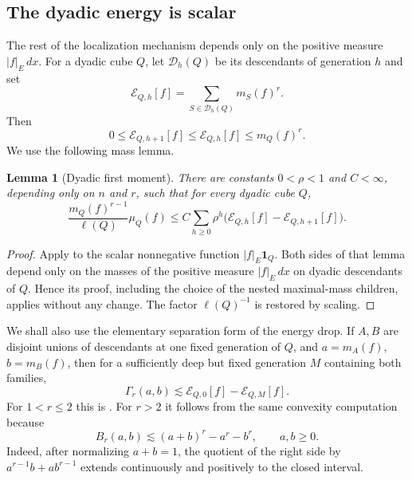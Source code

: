 \documentclass[11pt]{amsart}
\numberwithin{equation}{section}
\newtheorem{lemma}[theorem]{Lemma}
\theoremstyle{definition}
\theoremstyle{remark}
\newcommand{\cD}{\mathcal D}
\begin{document}
\subsection{The dyadic energy is scalar}
The rest of the localization mechanism depends only on the positive measure
$|f|_E\,dx$.  For a dyadic cube $Q$, let $\cD_h(Q)$ be its descendants of
generation $h$ and set
\begin{equation}\label{eq:energy}
 \mathcal E_{Q,h}[f]
 =\sum_{S\in\cD_h(Q)}m_S(f)^r.
\end{equation}
Then
\begin{equation}\label{eq:energy-monotone}
 0\le\mathcal E_{Q,h+1}[f]\le\mathcal E_{Q,h}[f]
 \le m_Q(f)^r.
\end{equation}
We use the following mass lemma.

\begin{lemma}[Dyadic first moment]\label{lem:dyadic-first-moment}
There are constants $0<\rho<1$ and $C<\infty$, depending only on $n$ and
$r$, such that for every dyadic cube $Q$,
\begin{equation}\label{eq:dyadic-first-moment}
 \frac{m_Q(f)^{r-1}}{\ell(Q)}\mu_Q(f)
 \le C\sum_{h\ge0}\rho^h
 \bigl(\mathcal E_{Q,h}[f]-\mathcal E_{Q,h+1}[f]\bigr).
\end{equation}
\end{lemma}

\begin{proof}
Apply \cite[Lemma~4.2]{Stolyarov24} to the scalar nonnegative function
$|f|_E\mathbf1_Q$.  Both sides of that lemma depend only on the masses of the
positive measure $|f|_E\,dx$ on dyadic descendants of $Q$.  Hence its proof,
including the choice of the nested maximal-mass children, applies without any
change.  The factor $\ell(Q)^{-1}$ is restored by scaling.
\end{proof}

We shall also use the elementary separation form of the energy drop.  If
$A,B$ are disjoint unions of descendants at one fixed generation of $Q$, and
$a=m_A(f)$, $b=m_B(f)$, then for a sufficiently deep but fixed generation
$M$ containing both families,
\begin{equation}\label{eq:separated-energy}
 \Gamma_r(a,b)
 \lesssim \mathcal E_{Q,0}[f]-\mathcal E_{Q,M}[f].
\end{equation}
For $1<r\le2$ this is \cite[Lemma~6.7]{Stolyarov24}.  For $r>2$ it follows
from the same convexity computation because
\begin{equation}\label{eq:Br-convexity}
 B_r(a,b)\lesssim (a+b)^r-a^r-b^r,
 \qquad a,b\ge0.
\end{equation}
Indeed, after normalizing $a+b=1$, the quotient of the right side by
$a^{r-1}b+ab^{r-1}$ extends continuously and positively to the closed
interval.
\end{document}
